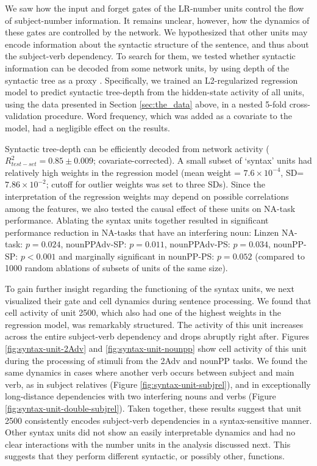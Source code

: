 We saw how the input and forget gates of the LR-number units control the flow
of subject-number information. It remains unclear, however, how the dynamics of these gates are controlled by the network. We hypothesized
that other units may encode information about the syntactic structure
of the sentence, and thus about the subject-verb dependency. To
search for them, we tested whether syntactic information can be
decoded from some network units, by using depth of the
syntactic tree as a proxy \cite{Nelson:etal:2017}. Specifically, we
trained an L2-regularized regression model to predict syntactic
tree-depth from the hidden-state activity of all units, using the data
presented in Section \ref{sec:the_data} above, in a nested 5-fold
cross-validation procedure. Word frequency, which was added as a covariate
to the model, had a negligible effect on the results.

Syntactic tree-depth can be efficiently decoded from network activity
($R^2_{test-set}=0.85\pm0.009$; covariate-corrected). A small subset of `syntax' units had relatively high weights in the regression model (mean weight = $7.6\times{}10^{-4}$, SD=$7.86\times{}10^{-2}$; cutoff for outlier weights was set to three SDs). Since the interpretation of the regression weights may depend on possible correlations among the features, we also tested the causal effect of these units on NA-task performance. Ablating the syntax units together resulted in significant performance reduction in NA-tasks that have an interfering noun: Linzen NA-task: $p=0.024$, nounPPAdv-SP: $p=0.011$, nounPPAdv-PS: $p=0.034$, nounPP-SP: $p<0.001$ and marginally significant in nounPP-PS: $p=0.052$ (compared to 1000 random ablations of subsets of units of the same size).

To gain further insight regarding the functioning of the syntax units,
we next visualized their gate and cell dynamics during sentence
processing. We found that cell activity of unit
\unit{2}{500}, which also had one of the highest weights in the
regression model, was remarkably structured. The activity of
this unit increases across the entire subject-verb
dependency and drops abruptly right after. Figures
\ref{fig:syntax-unit-2Adv} and \ref{fig:syntax-unit-nounpp} show cell
activity of this unit during the processing of stimuli from the 2Adv
and nounPP tasks. We found the same dynamics in cases where another
verb occurs between subject and main verb, as in subject relatives
(Figure \ref{fig:syntax-unit-subjrel}), and in exceptionally
long-distance dependencies with two interfering nouns and verbs
(Figure \ref{fig:syntax-unit-double-subjrel}). Taken together, these
results suggest that unit \unit{2}{500} consistently encodes
subject-verb dependencies in a syntax-sensitive manner. Other syntax
units did not show an easily interpretable dynamics and had no clear
interactions with the number units in the analysis discussed next. This
suggests that they perform different syntactic, or possibly other, functions.